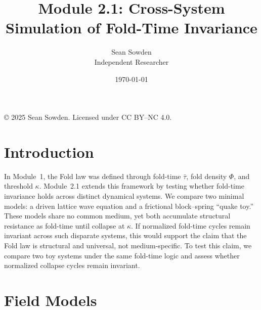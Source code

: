 \documentclass[12pt]{article}
\title{Module 2.1: Cross-System Simulation of Fold-Time Invariance}
\author{Sean Sowden \\ \small Independent Researcher}
\date{\today}
\begin{document}
\maketitle
\begin{center}
    \begingroup\small
\noindent © 2025 Sean Sowden. Licensed under CC BY--NC 4.0.
\par\endgroup

\end{center}

\setcounter{section}{0}
\setcounter{secnumdepth}{2} %
\setcounter{tocdepth}{2}    %
\renewcommand{\thesection}{2.1.\arabic{section}}
\renewcommand{\thesubsection}{2.1.\arabic{section}.\arabic{subsection}}
\renewcommand{\thesubsubsection}{2.1.\arabic{section}.\arabic{subsection}.\arabic{subsubsection}}
\section{Introduction}
In Module~1, the Fold law was defined through fold-time $\bar{\tau}$, fold density $\Phi$, and threshold $\kappa$. Module~2.1 extends this framework by testing whether fold-time invariance holds across distinct dynamical systems. We compare two minimal models: a driven lattice wave equation and a frictional block--spring ``quake toy.'' These models share no common medium, yet both accumulate structural resistance as fold-time until collapse at $\kappa$. If normalized fold-time cycles remain invariant across such disparate systems, this would support the claim that the Fold law is structural and universal, not medium-specific. To test this claim, we compare two toy systems under the same fold-time logic and assess whether normalized collapse cycles remain invariant.
\section{Field Models}
\end{document}
